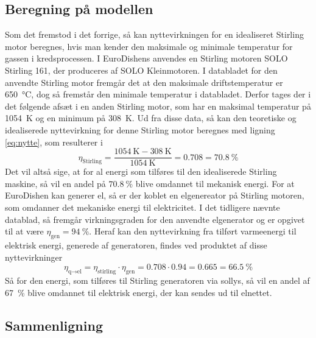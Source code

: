 \documentclass[SRC.tex]{subfiles}
\begin{document}
	\subsection{Beregning på modellen}
	Som det fremstod i det forrige, så kan nyttevirkningen for en idealiseret Stirling motor beregnes, hvis man kender den maksimale og minimale temperatur for gassen i kredsprocessen. I EuroDishens anvendes en Stirling motoren SOLO Stirling 161, der produceres af SOLO Kleinmotoren. I databladet for den anvendte Stirling motor fremgår det at den maksimale driftstemperatur er \SI{650}{\celsius}, dog så fremstår den minimale temperatur i databladet. Derfor tages der i det følgende afsæt i en anden Stirling motor, som har en maksimal temperatur på \SI{1054}{\kelvin} og en minimum på \SI{308}{\kelvin}. %
	Ud fra disse data, så kan den teoretiske og idealiserede nyttevirkning for denne Stirling motor beregnes med ligning \eqref{eq:nytte}, som resulterer i
	\begin{equation}
		\eta_{\text{Stirling}} = \frac{\SI{1054}{\kelvin} - \SI{308}{\kelvin}}{\SI{1054}{\kelvin}} = 0.708 = \SI{70.8}{\percent}
	\end{equation}
	Det vil altså sige, at for al energi som tilføres til den idealiserede Stirling maskine, så vil en andel på \(\SI{70.8}{\percent}\) blive omdannet til mekanisk energi. For at EuroDishen kan generer el, så er der koblet en elgenereator på Stirling motoren, som omdanner det mekaniske energi til elektricitet. I det tidligere nævnte datablad, så fremgår virkningsgraden for den anvendte elgenerator og er opgivet til at være \(\eta_{\text{gen}} = \SI{94}{\percent}\). Heraf kan den nyttevirkning fra tilført varmeenergi til elektrisk energi, generede af generatoren, findes ved produktet af disse nyttevirkninger
	\begin{equation}
		\eta_{\text{q}\rightarrow\text{el}} =  \eta_{\text{stirling}} \cdot \eta_{\text{gen}} = 0.708 \cdot 0.94 = 0.665 = \SI{66.5}{\percent}
	\end{equation}
	Så for den energi, som tilføres til Stirling generatoren via sollys, så vil en andel af \SI{67}{\percent} blive omdannet til elektrisk energi, der kan sendes ud til elnettet. 
	\subsection{Sammenligning}
\end{document}
